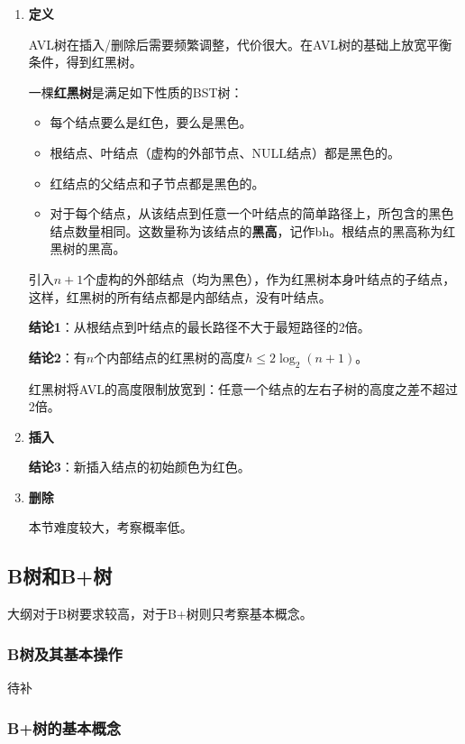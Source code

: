 \documentclass[12pt, a4paper, oneside]{ctexart}
\begin{document}
\begin{enumerate}
  \item {\bf 定义}
  
  AVL树在插入/删除后需要频繁调整，代价很大。在AVL树的基础上放宽平衡条件，得到红黑树。

  一棵\textbf{红黑树}是满足如下性质的BST树：
  \begin{itemize}
    \item 每个结点要么是红色，要么是黑色。
    \item 根结点、叶结点（虚构的外部节点、NULL结点）都是黑色的。
    \item 红结点的父结点和子节点都是黑色的。
    \item 对于每个结点，从该结点到任意一个叶结点的简单路径上，所包含的黑色结点数量相同。这数量称为该结点的\textbf{黑高}，记作bh。根结点的黑高称为红黑树的黑高。
  \end{itemize}

  引入$n+1$个虚构的外部结点（均为黑色），作为红黑树本身叶结点的子结点，这样，红黑树的所有结点都是内部结点，没有叶结点。

  \textbf{结论1}：从根结点到叶结点的最长路径不大于最短路径的2倍。

  \textbf{结论2}：有$n$个内部结点的红黑树的高度$h\leq 2\log_2 (n+1)$。

  红黑树将AVL的高度限制放宽到：任意一个结点的左右子树的高度之差不超过2倍。

  \item {\bf 插入}
  
  \textbf{结论3}：新插入结点的初始颜色为红色。

  

  \item {\bf 删除}
  
  本节难度较大，考察概率低。
\end{enumerate}

\subsection{B树和B+树}

大纲对于B树要求较高，对于B+树则只考察基本概念。

\subsubsection{B树及其基本操作}

待补

\subsubsection{B+树的基本概念}
\end{document}
